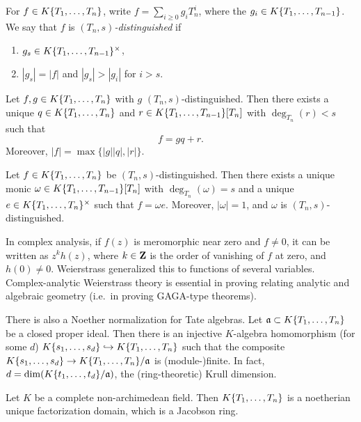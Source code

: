 \begin{definition}
For $f\in K\{ T_1,\dots,T_n \}$, write $f=\sum_{i\geqslant 0} g_i T_n^i$, 
where the $g_i\in K\{ T_1,\dots,T_{n-1} \}$. We say that $f$ is 
\emph{$(T_n,s)$-distinguished} if 
\begin{enumerate}
\item
$g_s\in K\{ T_1,\dots,T_{n-1} \}^\times$, 

\item
$|g_s| = |f|$ and $|g_s| > |g_i|$ for $i>s$. 
\end{enumerate}
\end{definition}

\begin{theorem}
Let $f,g\in K\{ T_1,\dots,T_n \}$ with $g$ 
$(T_n,s)$-distinguished. Then there exists a unique 
$q\in K\{ T_1,\dots,T_n \}$ and $r\in K\{ T_1,\dots,T_{n-1} \}[T_n]$ with 
$\deg_{T_n}(r)<s$ such that 
\[
	f = g q+r .
\]
Moreover, $|f|=\max\{|g||q|,|r|\}$. 
\end{theorem}

\begin{theorem}
Let $f\in K\{ T_1,\dots,T_n \}$ be $(T_n,s)$-distinguished. Then there 
exists a unique monic $\omega\in K\{ T_1,\dots,T_{n-1} \}[T_n]$ with 
$\deg_{T_n}(\omega) = s$ and a unique $e\in K\{ T_1,\dots,T_n \}^\times$ 
such that $f=\omega e$. Moreover, $|\omega|=1$, and $\omega$ is 
$(T_n,s)$-distinguished. 
\end{theorem}

In complex analysis, if $f(z)$ is meromorphic near zero and $f\ne 0$, it can be 
written as $z^k h(z)$, where $k\in \mathbf{Z}$ is the order of vanishing of $f$ at 
zero, and $h(0)\ne 0$. Weierstrass generalized this to functions of several 
variables. Complex-analytic Weierstrass theory is essential in proving relating 
analytic and algebraic geometry (i.e.~in proving GAGA-type theorems). 

There is also a Noether normalization for Tate algebras. Let 
$\mathfrak{a}\subset K\{ T_1,\dots,T_n \}$ be a closed proper ideal. Then there is 
an injective $K$-algebra homomorphism (for some $d$) 
$K\{ s_1,\dots,s_d \} \hookrightarrow K\{ T_1,\dots,T_n \}$ such that 
the composite $K\{ s_1,\dots,s_d \} \to K\{ T_1,\dots,T_n \}/\mathfrak{a}$ is 
(module-)finite. In fact, $d=\dim(K\{ t_1,\dots,t_d \}/\mathfrak{a})$, the 
(ring-theoretic) Krull dimension. 

\begin{theorem}
Let $K$ be a complete non-archimedean field. Then $K\{ T_1,\dots,T_n \}$ is 
a noetherian unique factorization domain, which is a Jacobson ring. 
\end{theorem}

